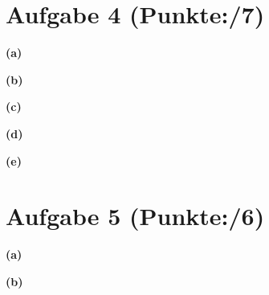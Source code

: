 \documentclass[11pt, a4paper]{article}
\newcommand{\ppp}{7}
\newcommand{\pppp}{6}
\begin{document}
\section*{Aufgabe 4 (Punkte:\qquad/\ppp)}
\textbf{(a)}
\begin{adjustwidth}{20pt}{20pt}

\end{adjustwidth}
\textbf{(b)}
\begin{adjustwidth}{20pt}{20pt}

\end{adjustwidth}
\textbf{(c)}
\begin{adjustwidth}{20pt}{20pt}

\end{adjustwidth}
\textbf{(d)}
\begin{adjustwidth}{20pt}{20pt}

\end{adjustwidth}
\textbf{(e)}
\begin{adjustwidth}{20pt}{20pt}

\end{adjustwidth}



\section*{Aufgabe 5 (Punkte:\qquad/\pppp)}
\textbf{(a)}
\begin{adjustwidth}{20pt}{20pt}
	
\end{adjustwidth}
\textbf{(b)}
\begin{adjustwidth}{20pt}{20pt}
	
\end{adjustwidth}
\end{document}
